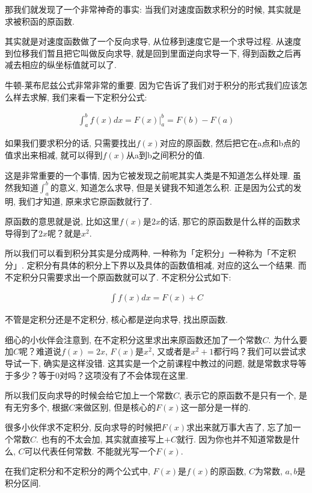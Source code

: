那我们就发现了一个非常神奇的事实: 当我们对速度函数求积分的时候, 其实就是求被积函的原函数. 

其实就是对速度函数做了一个反向求导, 从位移到速度它是一个求导过程. 从速度到位移我们暂且把它叫做反向求导, 就是回到里面逆向求导一下, 得到函数之后再减去相应的纵坐标值就可以了. 

牛顿-莱布尼兹公式非常非常的重要. 因为它告诉了我们对于积分的形式我们应该怎么样去求解, 我们来看一下定积分公式: 

\begin{align*}
  \int_a^b f(x)dx = F(x) \vert_a^b = F(b) - F(a)
\end{align*}

如果我们要求积分的话, 只需要找出$f(x)$对应的原函数, 然后把它在a点和b点的值求出来相减, 就可以得到$f(x)$从a到b之间积分的值. 

这是非常重要的一个事情, 因为它被发现之前呢其实人类是不知道怎么样处理. 虽然我知道$\int_a^b$的意义, 知道怎么求导, 但是关键我不知道怎么积. 正是因为公式的发明, 我们才知道, 原来求它原函数就行了. 

原函数的意思就是说, 比如这里$f(x)$是$2x$的话, 那它的原函数是什么样的函数求导得到了$2x$呢？就是$x^2$. 

所以我们可以看到积分其实是分成两种, 一种称为「定积分」一种称为「不定积分」. 定积分有具体的积分上下界以及具体的函数值相减, 对应的这么一个结果. 而不定积分只需要求出一个原函数就可以了. 不定积分公式如下: 

\begin{align*}
  \int f(x)dx = F(x) + C
\end{align*}

不管是定积分还是不定积分, 核心都是逆向求导, 找出原函数. 

细心的小伙伴会注意到, 在不定积分这里求出来原函数还加了一个常数$C$. 为什么要加$C$呢？难道说$f(x) = 2x$, $F(x)$是$x^2$, 又或者是$x^2 + 1$都行吗？我们可以尝试求导试一下, 确实是这样没错. 这其实是一个之前课程中教过的问题, 就是常数求导等于多少？等于0对吗？这项没有了不会体现在这里. 

所以我们反向求导的时候会给它加上一个常数$C$, 表示它的原函数不是只有一个, 是有无穷多个, 根据$C$来做区别, 但是核心的$F(x)$这一部分是一样的.

很多小伙伴求不定积分, 反向求导的时候把$F(x)$求出来就万事大吉了, 忘了加一个常数$C$. 也有的不太会加, 其实就直接写上$+C$就行. 因为你也并不知道常数是什么, $C$可以代表任何常数. 不能就光写一个$F(x)$. 

在我们定积分和不定积分的两个公式中,  $F(x)$是$f(x)$的原函数,  $C$为常数,  $a, b$是积分区间. 

